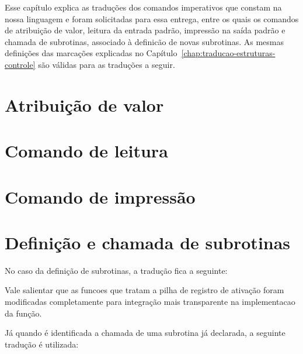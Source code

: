 
Esse capítulo explica as traduções dos comandos imperativos que constam na nossa linguagem e foram solicitadas para essa entrega, entre os quais os comandos de atribuição de valor, leitura da entrada padrão, impressão na saída padrão e chamada de subrotinas, associado à definicão de novas subrotinas. As mesmas definições das marcações explicadas no Capítulo~\ref{chap:traducao-estruturas-controle} são válidas para as traduções a seguir.

\section{Atribuição de valor}
\label{sec:atribuicao-valor}



\section{Comando de leitura}
\label{sec:leitura}



\section{Comando de impressão}
\label{sec:impressao}



\section{Definição e chamada de subrotinas}
\label{sec:subrotinas}

No caso da definição de subrotinas, a tradução fica a seguinte: 



Vale salientar que as funcoes que tratam a pilha de registro de ativação foram
modificadas completamente para integração mais transparente na implementacao da
função. 

Já quando é identificada a chamada de uma subrotina já declarada, a seguinte tradução é utilizada:


